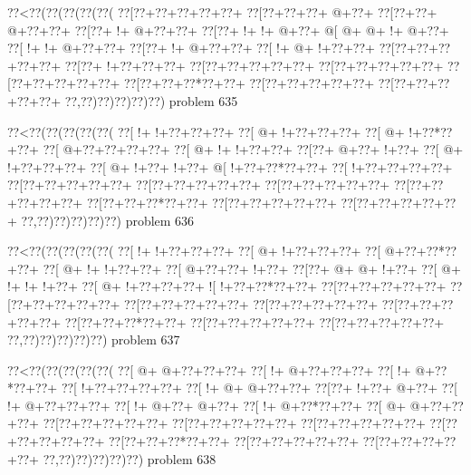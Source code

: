 \vbox{\vbox{\goo
\0??<\0??(\0??(\0??(\0??(\0??(
\0??[\0??+\0??+\0??+\0??+\0??+
\0??[\0??+\0??+\0??+\- @+\0??+
\0??[\0??+\0??+\- @+\0??+\0??+
\0??[\0??+\- !+\- @+\0??+\0??+
\0??[\0??+\- !+\- !+\- @+\0??+
\- @[\- @+\- @+\- !+\- @+\0??+
\0??[\- !+\- !+\- @+\0??+\0??+
\0??[\0??+\- !+\- @+\0??+\0??+
\0??[\- !+\- @+\- !+\0??+\0??+
\0??[\0??+\0??+\0??+\0??+\0??+
\0??[\0??+\- !+\0??+\0??+\0??+
\0??[\0??+\0??+\0??+\0??+\0??+
\0??[\0??+\0??+\0??+\0??+\0??+
\0??[\0??+\0??+\0??+\0??+\0??+
\0??[\0??+\0??+\0??*\0??+\0??+
\0??[\0??+\0??+\0??+\0??+\0??+
\0??[\0??+\0??+\0??+\0??+\0??+
\0??,\0??)\0??)\0??)\0??)\0??)
}
\hfil problem 635\hfil\break
}

\vbox{\vbox{\goo
\0??<\0??(\0??(\0??(\0??(\0??(
\0??[\- !+\- !+\0??+\0??+\0??+
\0??[\- @+\- !+\0??+\0??+\0??+
\0??[\- @+\- !+\0??*\0??+\0??+
\0??[\- @+\0??+\0??+\0??+\0??+
\0??[\- @+\- !+\- !+\0??+\0??+
\0??[\0??+\- @+\0??+\- !+\0??+
\0??[\- @+\- !+\0??+\0??+\0??+
\0??[\- @+\- !+\0??+\- !+\0??+
\- @[\- !+\0??+\0??*\0??+\0??+
\0??[\- !+\0??+\0??+\0??+\0??+
\0??[\0??+\0??+\0??+\0??+\0??+
\0??[\0??+\0??+\0??+\0??+\0??+
\0??[\0??+\0??+\0??+\0??+\0??+
\0??[\0??+\0??+\0??+\0??+\0??+
\0??[\0??+\0??+\0??*\0??+\0??+
\0??[\0??+\0??+\0??+\0??+\0??+
\0??[\0??+\0??+\0??+\0??+\0??+
\0??,\0??)\0??)\0??)\0??)\0??)
}
\hfil problem 636\hfil\break
}

\vbox{\vbox{\goo
\0??<\0??(\0??(\0??(\0??(\0??(
\0??[\- !+\- !+\0??+\0??+\0??+
\0??[\- @+\- !+\0??+\0??+\0??+
\0??[\- @+\0??+\0??*\0??+\0??+
\0??[\- @+\- !+\- !+\0??+\0??+
\0??[\- @+\0??+\0??+\- !+\0??+
\0??[\0??+\- @+\- @+\- !+\0??+
\0??[\- @+\- !+\- !+\- !+\0??+
\0??[\- @+\- !+\0??+\0??+\0??+
\- ![\- !+\0??+\0??*\0??+\0??+
\0??[\0??+\0??+\0??+\0??+\0??+
\0??[\0??+\0??+\0??+\0??+\0??+
\0??[\0??+\0??+\0??+\0??+\0??+
\0??[\0??+\0??+\0??+\0??+\0??+
\0??[\0??+\0??+\0??+\0??+\0??+
\0??[\0??+\0??+\0??*\0??+\0??+
\0??[\0??+\0??+\0??+\0??+\0??+
\0??[\0??+\0??+\0??+\0??+\0??+
\0??,\0??)\0??)\0??)\0??)\0??)
}
\hfil problem 637\hfil\break
}

\vbox{\vbox{\goo
\0??<\0??(\0??(\0??(\0??(\0??(
\0??[\- @+\- @+\0??+\0??+\0??+
\0??[\- !+\- @+\0??+\0??+\0??+
\0??[\- !+\- @+\0??*\0??+\0??+
\0??[\- !+\0??+\0??+\0??+\0??+
\0??[\- !+\- @+\- @+\0??+\0??+
\0??[\0??+\- !+\0??+\- @+\0??+
\0??[\- !+\- @+\0??+\0??+\0??+
\0??[\- !+\- @+\0??+\- @+\0??+
\0??[\- !+\- @+\0??*\0??+\0??+
\0??[\- @+\- @+\0??+\0??+\0??+
\0??[\0??+\0??+\0??+\0??+\0??+
\0??[\0??+\0??+\0??+\0??+\0??+
\0??[\0??+\0??+\0??+\0??+\0??+
\0??[\0??+\0??+\0??+\0??+\0??+
\0??[\0??+\0??+\0??*\0??+\0??+
\0??[\0??+\0??+\0??+\0??+\0??+
\0??[\0??+\0??+\0??+\0??+\0??+
\0??,\0??)\0??)\0??)\0??)\0??)
}
\hfil problem 638\hfil\break
}

